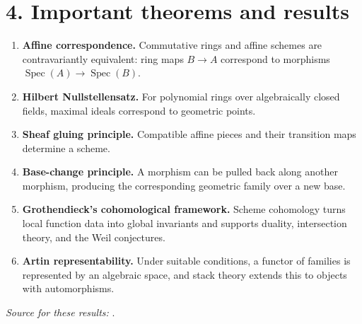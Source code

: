 \section*{4. Important theorems and results}
\begin{enumerate}[leftmargin=*,itemsep=0.35em]
\item \textbf{Affine correspondence.} Commutative rings and affine schemes are contravariantly equivalent: ring maps $B\to A$ correspond to morphisms $\operatorname{Spec}(A)\to\operatorname{Spec}(B)$.

\item \textbf{Hilbert Nullstellensatz.} For polynomial rings over algebraically closed fields, maximal ideals correspond to geometric points.

\item \textbf{Sheaf gluing principle.} Compatible affine pieces and their transition maps determine a scheme.

\item \textbf{Base-change principle.} A morphism can be pulled back along another morphism, producing the corresponding geometric family over a new base.

\item \textbf{Grothendieck's cohomological framework.} Scheme cohomology turns local function data into global invariants and supports duality, intersection theory, and the Weil conjectures.

\item \textbf{Artin representability.} Under suitable conditions, a functor of families is represented by an algebraic space, and stack theory extends this to objects with automorphisms.
\end{enumerate}
\noindent\emph{Source for these results:} \cite{scheme_ref1}.

